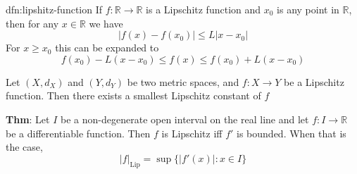 \documentclass[landscape, 8pt]{extarticle}
\begin{document}
\begin{multicols}{3}
\begin{dfn}{dfn:lipshitz-function}{}
    \longrule{0.08ex}
    If $f : \mathbb{R} \to \mathbb{R}$ is a Lipschitz function and $x_{0}$ is any point in $\mathbb{R}$, then for any $x\in \mathbb{R}$ we have
    \[\lvert f(x) - f(x_{0}) \rvert \le L\lvert x - x_{0} \rvert\]
    For $x \ge x_{0}$ this can be expanded to
    \[f(x_{0}) - L(x - x_{0}) \le f(x) \le f(x_{0}) + L(x - x_{0})\]

    \longrule{0.08ex}
    Let $(X, d_{X})$ and $(Y, d_{Y})$ be two metric spaces, and $f : X \to Y$ be a Lipschitz function. Then there exists a smallest Lipschitz constant of $f$

    \longrule{0.08ex}
    \textbf{Thm}: Let $I$ be a non-degenerate open interval on the real line and let $f : I \to \mathbb{R}$ be a differentiable function. Then $f$ is Lipschitz iff $f'$ is bounded. When that is the case,
    \[\lvert f \rvert_{\text{Lip}} = \sup \{\lvert f'(x) \rvert : x\in I\}\]
\end{dfn}

\lipsum[1-12]
\end{multicols}
\end{document}
